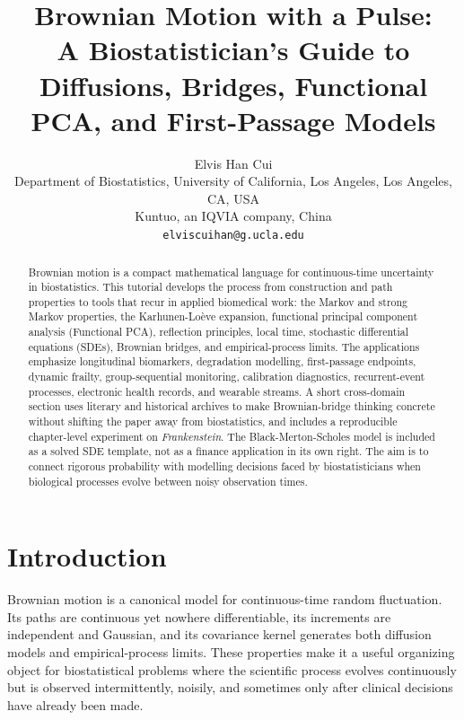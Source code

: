 \documentclass{article}
\title{Brownian Motion with a Pulse:\\A Biostatistician's Guide to Diffusions, Bridges, Functional PCA, and First-Passage Models}
\author{
  Elvis Han Cui\\[0.25em]
  {\normalfont\small Department of Biostatistics, University of California, Los Angeles, Los Angeles, CA, USA}\\
  {\normalfont\small Kuntuo, an IQVIA company, China}\\
  {\normalfont\small \texttt{elviscuihan@g.ucla.edu}}
}
\date{}
\theoremstyle{plain}
\theoremstyle{definition}
\begin{document}
\maketitle

\begin{abstract}
Brownian motion is a compact mathematical language for continuous-time uncertainty in biostatistics. This tutorial develops the process from construction and path properties to tools that recur in applied biomedical work: the Markov and strong Markov properties, the Karhunen-Loève expansion, functional principal component analysis (Functional PCA), reflection principles, local time, stochastic differential equations (SDEs), Brownian bridges, and empirical-process limits. The applications emphasize longitudinal biomarkers, degradation modelling, first-passage endpoints, dynamic frailty, group-sequential monitoring, calibration diagnostics, recurrent-event processes, electronic health records, and wearable streams. A short cross-domain section uses literary and historical archives to make Brownian-bridge thinking concrete without shifting the paper away from biostatistics, and includes a reproducible chapter-level experiment on \emph{Frankenstein}. The Black-Merton-Scholes model is included as a solved SDE template, not as a finance application in its own right. The aim is to connect rigorous probability with modelling decisions faced by biostatisticians when biological processes evolve between noisy observation times.
\end{abstract}


\section{Introduction}

Brownian motion is a canonical model for continuous-time random fluctuation. Its paths are continuous yet nowhere differentiable, its increments are independent and Gaussian, and its covariance kernel generates both diffusion models and empirical-process limits. These properties make it a useful organizing object for biostatistical problems where the scientific process evolves continuously but is observed intermittently, noisily, and sometimes only after clinical decisions have already been made.
\end{document}
